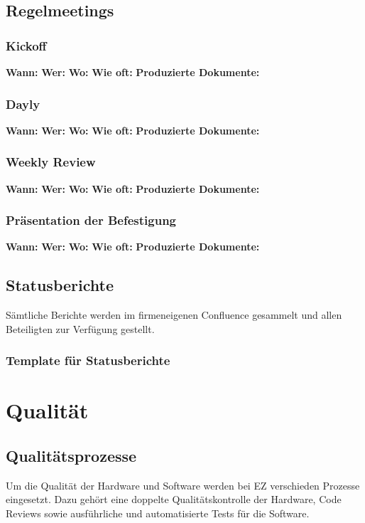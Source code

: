 \subsection{Regelmeetings}
 
\subsubsection{Kickoff}
\textbf{Wann:} 
\textbf{Wer:}
\textbf{Wo:}
\textbf{Wie oft:}
\textbf{Produzierte Dokumente:}


\subsubsection{Dayly}
\textbf{Wann:} 
\textbf{Wer:}
\textbf{Wo:}
\textbf{Wie oft:}
\textbf{Produzierte Dokumente:}

\subsubsection{Weekly Review}
\textbf{Wann:} 
\textbf{Wer:}
\textbf{Wo:}
\textbf{Wie oft:}
\textbf{Produzierte Dokumente:}

\subsubsection{Präsentation der Befestigung}
\textbf{Wann:} 
\textbf{Wer:}
\textbf{Wo:}
\textbf{Wie oft:}
\textbf{Produzierte Dokumente:}

\subsection{Statusberichte}
Sämtliche Berichte werden im firmeneigenen Confluence gesammelt und allen Beteiligten zur Verfügung gestellt.

\subsubsection{Template für Statusberichte}


\section{Qualität}
\subsection{Qualitätsprozesse}
Um die Qualität der Hardware und Software werden bei EZ verschieden Prozesse eingesetzt. Dazu gehört eine doppelte Qualitätskontrolle der Hardware, Code Reviews sowie ausführliche und automatisierte Tests für die Software.
